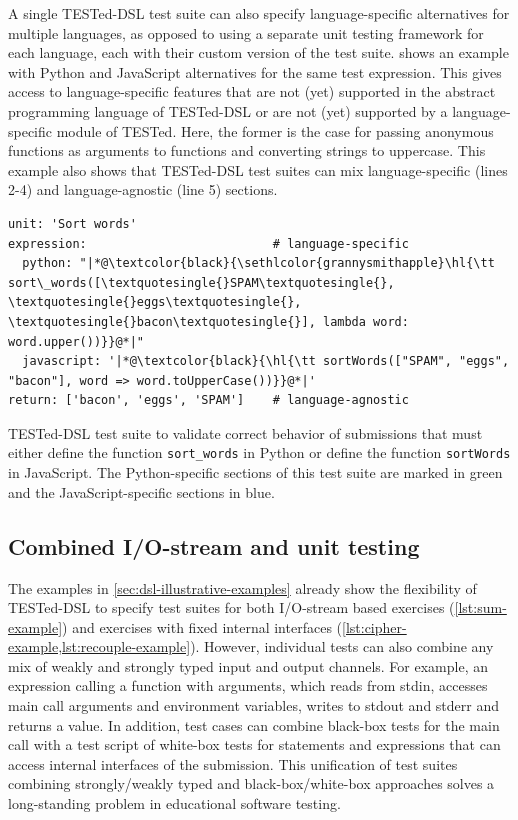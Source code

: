 \documentclass[../main]{subfiles}
\begin{document}
A single TESTed-DSL test suite can also specify language-specific alternatives for multiple languages, as opposed to using a separate unit testing framework for each language, each with their custom version of the test suite.
 shows an example with Python and JavaScript alternatives for the same test expression.
This gives access to language-specific features that are not (yet) supported in the abstract programming language of TESTed-DSL or are not (yet) supported by a language-specific module of TESTed.
Here, the former is the case for passing anonymous functions as arguments to functions and converting strings to uppercase.
This example also shows that TESTed-DSL test suites can mix language-specific (lines 2-4) and language-agnostic (line 5) sections.

\begin{listing}
    \begin{verbatim}
unit: 'Sort words'
expression:                          # language-specific
  python: "|*@\textcolor{black}{\sethlcolor{grannysmithapple}\hl{\tt sort\_words([\textquotesingle{}SPAM\textquotesingle{}, \textquotesingle{}eggs\textquotesingle{}, \textquotesingle{}bacon\textquotesingle{}], lambda word: word.upper())}}@*|"
  javascript: '|*@\textcolor{black}{\hl{\tt sortWords(["SPAM", "eggs", "bacon"], word => word.toUpperCase())}}@*|'
return: ['bacon', 'eggs', 'SPAM']    # language-agnostic
    \end{verbatim}
    \caption[]{
        TESTed-DSL test suite to validate correct behavior of submissions that must either define the function \texttt{sort\_words} in Python or define the function \texttt{sortWords} in JavaScript. The Python-specific sections of this test suite are marked in green and the JavaScript-specific sections in blue.
    }
    \label{lst:multiple-test-suite}
\end{listing}

\subsection{Combined I/O-stream and unit testing}\label{subsec:combined-i/o-stream-and-unit-testing}

The examples in \vref{sec:dsl-illustrative-examples} already show the flexibility of TESTed-DSL to specify test suites for both I/O-stream based exercises (\vref{lst:sum-example}) and exercises with fixed internal interfaces (\vref{lst:cipher-example,lst:recouple-example}).
However, individual tests can also combine any mix of weakly and strongly typed input and output channels.
For example, an expression calling a function with arguments, which reads from stdin, accesses main call arguments and environment variables, writes to stdout and stderr and returns a value.
In addition, test cases can combine black-box tests for the main call with a test script of white-box tests for statements and expressions that can access internal interfaces of the submission.
This unification of test suites combining strongly/weakly typed and black-box/white-box approaches solves a long-standing problem in educational software testing.
\end{document}

